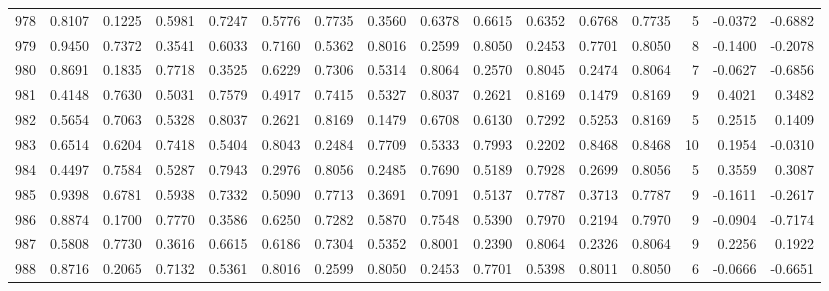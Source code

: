 \begin{tabular}{lrrrrrrrrrrrrrrr}
978 &      0.8107 &  0.1225 &  0.5981 &  0.7247 &  0.5776 &  0.7735 &  0.3560 &  0.6378 &  0.6615 &  0.6352 &   0.6768 &     0.7735 &      5 &                   -0.0372 &                    -0.6882 \\
979 &      0.9450 &  0.7372 &  0.3541 &  0.6033 &  0.7160 &  0.5362 &  0.8016 &  0.2599 &  0.8050 &  0.2453 &   0.7701 &     0.8050 &      8 &                   -0.1400 &                    -0.2078 \\
980 &      0.8691 &  0.1835 &  0.7718 &  0.3525 &  0.6229 &  0.7306 &  0.5314 &  0.8064 &  0.2570 &  0.8045 &   0.2474 &     0.8064 &      7 &                   -0.0627 &                    -0.6856 \\
981 &      0.4148 &  0.7630 &  0.5031 &  0.7579 &  0.4917 &  0.7415 &  0.5327 &  0.8037 &  0.2621 &  0.8169 &   0.1479 &     0.8169 &      9 &                    0.4021 &                     0.3482 \\
982 &      0.5654 &  0.7063 &  0.5328 &  0.8037 &  0.2621 &  0.8169 &  0.1479 &  0.6708 &  0.6130 &  0.7292 &   0.5253 &     0.8169 &      5 &                    0.2515 &                     0.1409 \\
983 &      0.6514 &  0.6204 &  0.7418 &  0.5404 &  0.8043 &  0.2484 &  0.7709 &  0.5333 &  0.7993 &  0.2202 &   0.8468 &     0.8468 &     10 &                    0.1954 &                    -0.0310 \\
984 &      0.4497 &  0.7584 &  0.5287 &  0.7943 &  0.2976 &  0.8056 &  0.2485 &  0.7690 &  0.5189 &  0.7928 &   0.2699 &     0.8056 &      5 &                    0.3559 &                     0.3087 \\
985 &      0.9398 &  0.6781 &  0.5938 &  0.7332 &  0.5090 &  0.7713 &  0.3691 &  0.7091 &  0.5137 &  0.7787 &   0.3713 &     0.7787 &      9 &                   -0.1611 &                    -0.2617 \\
986 &      0.8874 &  0.1700 &  0.7770 &  0.3586 &  0.6250 &  0.7282 &  0.5870 &  0.7548 &  0.5390 &  0.7970 &   0.2194 &     0.7970 &      9 &                   -0.0904 &                    -0.7174 \\
987 &      0.5808 &  0.7730 &  0.3616 &  0.6615 &  0.6186 &  0.7304 &  0.5352 &  0.8001 &  0.2390 &  0.8064 &   0.2326 &     0.8064 &      9 &                    0.2256 &                     0.1922 \\
988 &      0.8716 &  0.2065 &  0.7132 &  0.5361 &  0.8016 &  0.2599 &  0.8050 &  0.2453 &  0.7701 &  0.5398 &   0.8011 &     0.8050 &      6 &                   -0.0666 &                    -0.6651 \\

\end{tabular}
